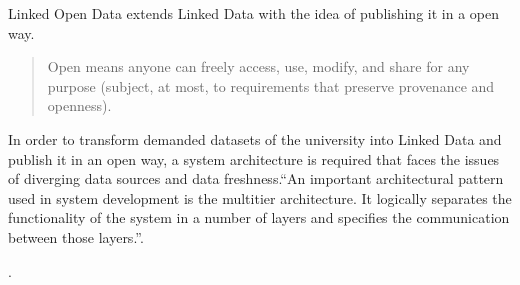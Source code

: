 Linked Open Data extends Linked Data with the idea of publishing it in a open way.
\begin{quote} Open means anyone can freely access, use, modify, and share for any purpose (subject, at most, to requirements that preserve provenance and openness).\cite{_open_????}\end{quote}

In order to transform demanded datasets of the university into Linked Data and publish it in an open way, a system architecture is required that faces the issues of diverging data sources and data freshness.\enquote{An important architectural pattern used in system development is the multitier architecture. It logically separates the functionality of the system in a number of layers and specifies the communication between those layers.}\cite{simperl_using_2013}.

. 

